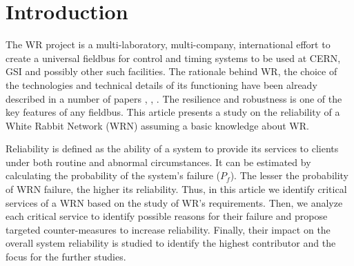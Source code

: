 \section{Introduction}

The WR project is a multi-laboratory, 
multi-company, international effort to create a universal fieldbus for control and timing systems 
to be used at CERN, GSI and possibly other such facilities. The rationale behind WR, 
the choice of the technologies and technical details of its functioning have been already 
described in a number of papers \cite{biblio:WRproject}, \cite{biblio:TomekMSc}, 
\cite{biblio:WRPTP}. 
The resilience and robustness is one of the key features of any fieldbus. 
This article presents a study on the reliability of a White Rabbit Network (WRN) 
assuming a basic knowledge about WR. 

Reliability is defined as the ability of a system to provide its services to clients under both 
routine and abnormal circumstances. It can be estimated by calculating the probability of 
the system's failure ($P_f$). 
The lesser the probability of WRN failure, the higher its reliability. Thus, in this article we 
identify critical services of a WRN based on the study of WR's requirements. 
Then, we analyze each critical service to identify possible 
reasons for their failure and propose targeted counter-measures to increase reliability. 
Finally, their impact on the overall system reliability is studied to 
identify the highest contributor and the focus for the further studies.

